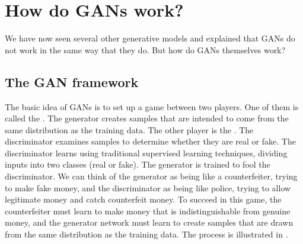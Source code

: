 \section{How do GANs work?}

We have now seen several other generative models and explained that GANs do not
work in the same way that they do. But how do GANs themselves work?

\subsection{The GAN framework}

The basic idea of GANs is to set up a game between two players.
One of them is called the .
The generator creates samples that are intended to come from the
same distribution as the training data.
The other player is the .
The discriminator examines samples to determine whether they are real
or fake.
The discriminator learns using traditional supervised learning techniques,
dividing inputs into two classes (real or fake).
The generator is trained to fool the discriminator.
We can think of the generator as being like a counterfeiter, trying to
make fake money, and the discriminator as being like police, trying to
allow legitimate money and catch counterfeit money.
To succeed in this game, the counterfeiter must learn to make money that
is indistinguishable from genuine money, and the generator network must
learn to create samples that are drawn from the same distribution as the
training data.
The process is illustrated in .

